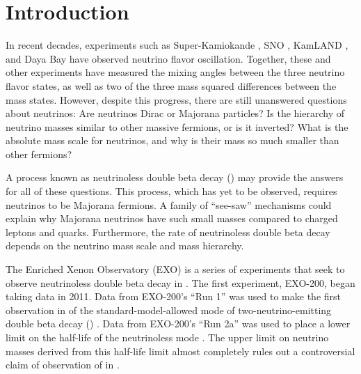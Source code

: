 \documentclass[herrin-thesis.tex]{subfiles}
\begin{document}
\chapter{Introduction}

In recent decades, experiments such as Super-Kamiokande \cite{Fukuda:1998zr}, SNO \cite{Ahmad:2001ys}, KamLAND \cite{PhysRevLett.90.021802}, and Daya Bay \cite{PhysRevLett.108.171803} have observed neutrino flavor oscillation. Together, these and other experiments have measured the mixing angles between the three neutrino flavor states, as well as two of the three mass squared differences between the mass states. However, despite this progress, there are still unanswered questions about neutrinos: Are neutrinos Dirac or Majorana particles? Is the hierarchy of neutrino masses similar to other massive fermions, or is it inverted? What is the absolute mass scale for neutrinos, and why is their mass so much smaller than other fermions?

A process known as neutrinoless double beta decay (\zeronu{}) may provide the answers for all of these questions. This process, which has yet to be observed, requires neutrinos to be Majorana fermions. A family of ``see-saw'' mechanisms could explain why Majorana neutrinos have such small masses compared to charged leptons and quarks. Furthermore, the rate of neutrinoless double beta decay depends on the neutrino mass scale and mass hierarchy.

The Enriched Xenon Observatory (EXO) is a series of experiments that seek to observe neutrinoless double beta decay in . The first experiment, EXO-200, began taking data in 2011. Data from EXO-200's ``Run 1'' was used to make the first observation in  of the standard-model-allowed mode of two-neutrino-emitting double beta decay (\twonu) \cite{Ackerman:2011gz}. Data from EXO-200's ``Run 2a'' was used to place a lower limit on the half-life of the neutrinoless mode \cite{Auger:2012ar}. The upper limit on neutrino masses derived from this half-life limit almost completely rules out a controversial claim of observation of \zeronu{} in  \cite{KlapdorKleingrothaus:2006ff}.
\end{document}
